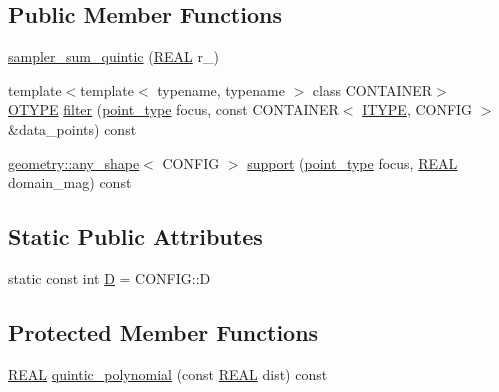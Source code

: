 \subsection*{Public Member Functions}
\begin{DoxyCompactItemize}
\item 
\hyperlink{classmui_1_1sampler__sum__quintic_a759cd2acccbbe273bbd7bb65016f68fb}{sampler\+\_\+sum\+\_\+quintic} (\hyperlink{classmui_1_1sampler__sum__quintic_a9cbbc0e8f2384abe39ec2339229b64b6}{R\+E\+AL} r\+\_\+)
\item 
{\footnotesize template$<$template$<$ typename, typename $>$ class C\+O\+N\+T\+A\+I\+N\+ER$>$ }\\\hyperlink{classmui_1_1sampler__sum__quintic_a524db204f563b4f3d1eedded2e39ba8b}{O\+T\+Y\+PE} \hyperlink{classmui_1_1sampler__sum__quintic_aadcd797ddd143dd5eacf60f9cfad5852}{filter} (\hyperlink{classmui_1_1sampler__sum__quintic_a661c2038a21043ac8e41beeeb07978ad}{point\+\_\+type} focus, const C\+O\+N\+T\+A\+I\+N\+ER$<$ \hyperlink{classmui_1_1sampler__sum__quintic_aefb0c5d19f1e834ee9d4c41efe31d222}{I\+T\+Y\+PE}, C\+O\+N\+F\+IG $>$ \&data\+\_\+points) const
\item 
\hyperlink{classmui_1_1geometry_1_1any__shape}{geometry\+::any\+\_\+shape}$<$ C\+O\+N\+F\+IG $>$ \hyperlink{classmui_1_1sampler__sum__quintic_a20a6fc174d4c0c576f8dca8f190eae1c}{support} (\hyperlink{classmui_1_1sampler__sum__quintic_a661c2038a21043ac8e41beeeb07978ad}{point\+\_\+type} focus, \hyperlink{classmui_1_1sampler__sum__quintic_a9cbbc0e8f2384abe39ec2339229b64b6}{R\+E\+AL} domain\+\_\+mag) const
\end{DoxyCompactItemize}
\subsection*{Static Public Attributes}
\begin{DoxyCompactItemize}
\item 
static const int \hyperlink{classmui_1_1sampler__sum__quintic_a0e19a99af2256201e461cb7e066f42eb}{D} = C\+O\+N\+F\+I\+G\+::D
\end{DoxyCompactItemize}
\subsection*{Protected Member Functions}
\begin{DoxyCompactItemize}
\item 
\hyperlink{classmui_1_1sampler__sum__quintic_a9cbbc0e8f2384abe39ec2339229b64b6}{R\+E\+AL} \hyperlink{classmui_1_1sampler__sum__quintic_a5864c34fdc7016a2bf6750ecc3b93f67}{quintic\+\_\+polynomial} (const \hyperlink{classmui_1_1sampler__sum__quintic_a9cbbc0e8f2384abe39ec2339229b64b6}{R\+E\+AL} dist) const
\end{DoxyCompactItemize}
